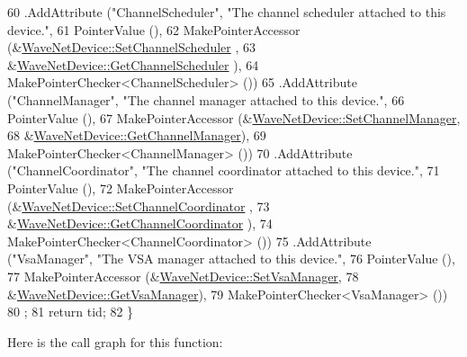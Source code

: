 \begin{DoxyCode}
60     .AddAttribute (\textcolor{stringliteral}{"ChannelScheduler"}, \textcolor{stringliteral}{"The channel scheduler attached to this device."},
61                    PointerValue (),
62                    MakePointerAccessor (&\hyperlink{classns3_1_1WaveNetDevice_a3aa4f3edcb781fca5306e817315cd31b}{WaveNetDevice::SetChannelScheduler}
      ,
63                                         &\hyperlink{classns3_1_1WaveNetDevice_abae0924be9be442fa0b234c82047e368}{WaveNetDevice::GetChannelScheduler}
      ),
64                    MakePointerChecker<ChannelScheduler> ())
65     .AddAttribute (\textcolor{stringliteral}{"ChannelManager"}, \textcolor{stringliteral}{"The channel manager attached to this device."},
66                    PointerValue (),
67                    MakePointerAccessor (&\hyperlink{classns3_1_1WaveNetDevice_acc72aa6c137e1c78c6e5bc3c19973ef4}{WaveNetDevice::SetChannelManager},
68                                         &\hyperlink{classns3_1_1WaveNetDevice_a4c0b3d018ff1ade5c8c9375d9e43f5ad}{WaveNetDevice::GetChannelManager}),
69                    MakePointerChecker<ChannelManager> ())
70     .AddAttribute (\textcolor{stringliteral}{"ChannelCoordinator"}, \textcolor{stringliteral}{"The channel coordinator attached to this device."},
71                    PointerValue (),
72                    MakePointerAccessor (&\hyperlink{classns3_1_1WaveNetDevice_a0bd0431f70e5ea68ae818650b6ff06d8}{WaveNetDevice::SetChannelCoordinator}
      ,
73                                         &\hyperlink{classns3_1_1WaveNetDevice_af2995fc465c490ae033e98c5beabd7f1}{WaveNetDevice::GetChannelCoordinator}
      ),
74                    MakePointerChecker<ChannelCoordinator> ())
75     .AddAttribute (\textcolor{stringliteral}{"VsaManager"}, \textcolor{stringliteral}{"The VSA manager attached to this device."},
76                    PointerValue (),
77                    MakePointerAccessor (&\hyperlink{classns3_1_1WaveNetDevice_a67b70adf83f3029059e45b8f99901b9d}{WaveNetDevice::SetVsaManager},
78                                         &\hyperlink{classns3_1_1WaveNetDevice_a41e53ba04e34f65d93bbc34f088093db}{WaveNetDevice::GetVsaManager}),
79                    MakePointerChecker<VsaManager> ())
80   ;
81   \textcolor{keywordflow}{return} tid;
82 \}
\end{DoxyCode}


Here is the call graph for this function\+:


